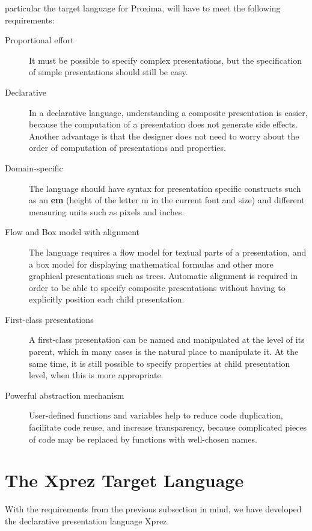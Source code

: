         particular the target language for Proxima, will have to meet the following
        requirements: 
 \begin{description}
 
 \item[Proportional effort]
 It must be possible to specify complex presentations, but the
          specification of simple presentations should still be easy.
 \item[Declarative]
In a declarative language, understanding a composite presentation
          is easier, because the computation of a presentation does not generate side
          effects. Another advantage is that the designer does not need to worry about
          the order of computation of presentations and properties.
 \item[Domain-specific]
 The language should have syntax for presentation specific
          constructs such as an {\bf em} (height of the letter m in the current font and
          size) and different measuring units such as pixels and inches.
 \item[Flow and Box model with alignment]
The language requires a flow model for textual parts of a
          presentation, and a box model for displaying mathematical formulas and other
          more graphical presentations such as trees. Automatic alignment is required in
          order to be able to specify composite presentations without having to
          explicitly position each child presentation.
 \item[First-class presentations]
A first-class presentation can be named and manipulated at the
          level of its parent, which in many cases is the natural place to manipulate it.
          At the same time, it is still possible to specify properties at child
          presentation level, when this is more appropriate.
 \item[Powerful abstraction mechanism]
User-defined functions and var\-i\-ables help to reduce code
          duplication, facilitate code reuse, and increase transparency, because
          complicated pieces of code may be replaced by functions with well-chosen
          names.
 \end{description}

\section{The {\sc Xprez} Target Language}
\label{xpreztarget}
\par With the requirements from the previous subsection in mind, we have
      developed the declarative presentation language {\sc Xprez}. 
